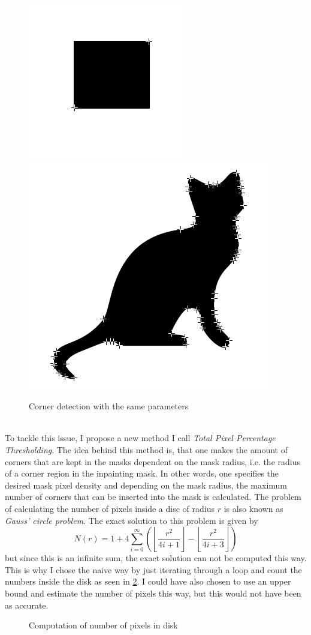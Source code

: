 \begin{figure}[h!]
    \centering
    \includegraphics[width=0.4\linewidth]{../Images/example_rect_50.png}
    \includegraphics[width=0.4\linewidth]{../Images/example_cat_50.png}
    \caption{Corner detection with the same parameters}%
    \label{fig:PercExample}
\end{figure}\\
To tackle this issue, I propose a new method I call \textit{Total Pixel Percentage
Thresholding}. The idea behind this method is, that one makes the amount of corners that are kept
in the masks dependent on the mask radius, i.e. the radius of a corner region in the inpainting
mask. In other words, one specifies the desired mask pixel density and depending on the mask
radius, the maximum number of corners that can be inserted into the mask is calculated.
The problem of calculating the number of pixels inside a disc of radius $r$ is also known as
\textit{Gauss' circle problem}\cite{gaussCircle}. The exact solution to this problem is given
by\cite{hilbert96}
\begin{equation}
    N(r) = 1 + 4\sum_{i=0}^{\infty}\left(\left\lfloor\frac{r^2}{4i+1}\right\rfloor - \left\lfloor
    \frac{r^2}{4i+3}\right\rfloor\right)
\end{equation}
but since this is an infinite sum, the exact solution can not be computed this way. This is why I
chose the naive way by just iterating through a loop and count the numbers inside the disk as seen
in \ref{fig:PixelRegion}. 
I could have also chosen to use an upper bound and estimate the number of pixels this way, but this
would not have been as accurate.
\begin{figure}[ht]
    \centering
    
    \caption{Computation of number of pixels in disk}
    \label{fig:PixelRegion}
\end{figure}

